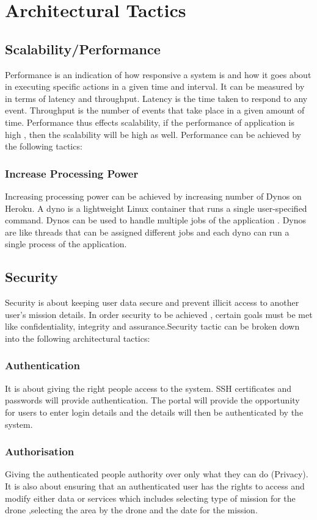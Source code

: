 \documentclass{article}
\begin{document}
	
	
	
	\section{Architectural Tactics}%
	\subsection{Scalability/Performance }
	Performance is an indication of how responsive a system is and how it goes about in executing specific actions in a given time and interval. It can be measured by in terms of latency and throughput.
	Latency is the time taken to respond to any event. Throughput is the number of events that take place in a given amount of time. Performance thus effects scalability, if the performance of application is high , then the scalability will be high as well. Performance can be achieved by the following tactics:
	\subsubsection{Increase Processing Power}
	Increasing processing power can be achieved by increasing number of Dynos on Heroku. A dyno is a lightweight Linux container that runs a single user-specified command. Dynos can be used to handle multiple jobs of the application . Dynos are like threads that can be assigned different jobs and each dyno can run a single process of the application.
	\subsection{Security}
	Security is about keeping user data secure and prevent illicit access to another user's mission details. In order security to be achieved , certain goals must be met like confidentiality, integrity and assurance.Security tactic can be broken down into the following architectural tactics: 
	\subsubsection{Authentication}
	It is about giving the right people access to the system. SSH certificates and passwords will provide authentication. The portal will provide the opportunity for users to enter login details and the details will then be authenticated by the system. 
	\subsubsection{Authorisation}
	Giving the authenticated people authority over only what they can do (Privacy). It is also about ensuring that an authenticated user has the rights to access and modify either data or services which includes selecting type of mission for the drone ,selecting the area by the drone and the date for the mission.
	
\end{document}

